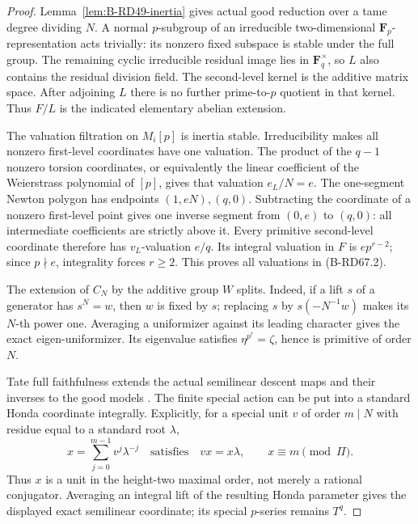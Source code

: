 \begin{proof}
Lemma~\ref{lem:B-RD49-inertia} gives actual good reduction over
a tame degree dividing \(N\). A normal \(p\)-subgroup of an
irreducible two-dimensional \(\mathbf F_p\)-representation acts
trivially: its nonzero fixed subspace is stable under the full
group. The remaining cyclic irreducible residual image lies in
\(\mathbf F_q^\times\), so \(L\) also contains the residual division
field. The second-level kernel is the additive matrix space.
After adjoining \(L\) there is no further prime-to-\(p\) quotient
in that kernel. Thus \(F/L\) is the indicated elementary abelian
extension.

The valuation filtration on \(M_i[p]\) is inertia stable.
Irreducibility makes all nonzero first-level coordinates have
one valuation. The product of the \(q-1\) nonzero torsion
coordinates, or equivalently the linear coefficient of the
Weierstrass polynomial of \([p]\), gives that valuation
\(e_L/N=e\). The one-segment Newton polygon has endpoints
\((1,eN),(q,0)\). Subtracting the coordinate of a nonzero
first-level point gives one inverse segment from \((0,e)\) to
\((q,0)\): all intermediate coefficients are strictly above it.
Every primitive second-level coordinate therefore has
\(v_L\)-valuation \(e/q\). Its integral valuation in \(F\) is
\(e p^{r-2}\); since \(p\nmid e\), integrality forces \(r\ge2\).
This proves all valuations in (B-RD67.2).

The extension of \(C_N\) by the additive group \(W\) splits.
Indeed, if a lift \(s\) of a generator has \(s^N=w\), then \(w\)
is fixed by \(s\); replacing \(s\) by \(s(-N^{-1}w)\) makes its
\(N\)-th power one. Averaging a uniformizer against its leading
character gives the exact eigen-uniformizer. Its eigenvalue
satisfies \(\eta^{p^r}=\zeta\), hence is primitive of order \(N\).

Tate full faithfulness extends the actual semilinear descent maps
and their inverses to the good models
\cite[Theorem 4 and Corollaries 1--2, p.~181]{Tate1967PDivisible}.
The finite special action can be put into a standard Honda
coordinate integrally. Explicitly, for a special unit \(v\) of
order \(m\mid N\) with residue equal to a standard root \(\lambda\),
\[
 x=\sum_{j=0}^{m-1}v^j\lambda^{-j}
 \quad\text{satisfies}\quad vx=x\lambda,\qquad
 x\equiv m\pmod\Pi .
\]
Thus \(x\) is a unit in the height-two maximal order, not merely
a rational conjugator. Averaging an integral lift of the resulting
Honda parameter gives the displayed exact semilinear coordinate;
its special \(p\)-series remains \(T^q\).


\end{proof}
